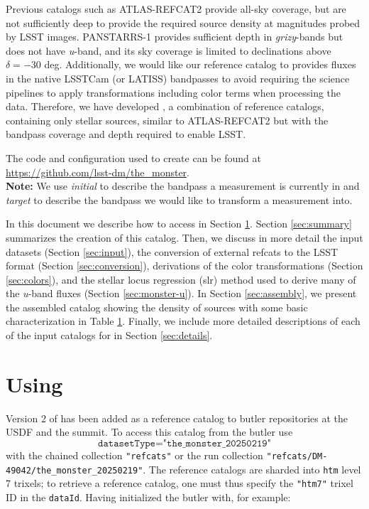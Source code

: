 Previous catalogs such as ATLAS-REFCAT2 \citep{2018ApJ...867..105T} provide all-sky coverage, but are not sufficiently deep to provide the required source density at magnitudes probed by LSST images.
PANSTARRS-1\citep[PS1;][]{2016arXiv161205560C} provides sufficient depth in \emph{grizy}-bands but does not have \emph{u}-band, and its sky coverage is limited to declinations above $\delta = -30$ deg.
Additionally, we would like our reference catalog to provides fluxes in the native LSSTCam (or LATISS) bandpasses to avoid requiring the science pipelines to apply transformations including color terms when processing the data.
Therefore, we have developed \monster, a combination of reference catalogs, containing only stellar sources, similar to ATLAS-REFCAT2 but with the bandpass coverage and depth required to enable LSST.

The code and configuration used to create \monster can be found at \url{https://github.com/lsst-dm/the_monster}.\\

\textbf{Note:} We use \emph{initial} to describe the bandpass a measurement is currently in and \emph{target} to describe the bandpass we would like to transform a measurement into.

In this document we describe how to access \monster in Section \ref{sec:using}. Section \ref{sec:summary} summarizes the creation of this catalog. 
Then, we discuss in more detail the input datasets (Section \ref{sec:input}), the conversion of external refcats to the LSST format (Section \ref{sec:conversion}), derivations of the color transformations (Section \ref{sec:colors}), and the stellar locus regression (slr) method used to derive many of the \emph{u}-band fluxes (Section \ref{sec:monster-u}).
In Section \ref{sec:assembly}, we present the assembled catalog showing the density of sources with some basic characterization in Table \hyperref[tab:summary]{1}.
Finally, we include more detailed descriptions of each of the input catalogs for \monster in Section \ref{sec:details}.

\section{Using \monster}
\label{sec:using}
Version 2 of \monster has been added as a reference catalog to butler repositories at the USDF and the summit.
To access this catalog from the butler use
$$\texttt{datasetType="the\_monster\_20250219"}$$
with the chained collection \texttt{"refcats"} or the run collection \texttt{"refcats/DM-49042/the\_monster\_20250219"}.
The reference catalogs are sharded into \texttt{htm} level 7 trixels; to retrieve a reference catalog, one must thus specify the \texttt{"htm7"} trixel ID in the \texttt{dataId}. Having initialized the butler with, for example:

